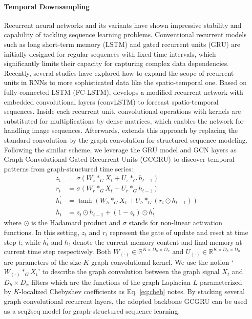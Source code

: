 \documentclass[sigconf,screen]{acmart}
\begin{document}
\paragraph{Temporal Downsampling}
Recurrent neural networks and its variants have shown impressive stability and capability of tackling sequence learning problems. Conventional recurrent models such as long short-term memory (LSTM) \cite{hochreiter1997long} and gated recurrent units (GRU) \cite{chung2014empirical} are initially designed for regular sequences with fixed time intervals, which significantly limits their capacity for capturing complex data dependencies. Recently, several studies have explored how to expand the scope of recurrent units in RNNs to more sophisticated data like the spatio-temporal one. Based on fully-connected LSTM (FC-LSTM), \cite{xingjian2015convolutional} develops a modified recurrent network with embedded convolutional layers (convLSTM) to forecast spatio-temporal sequences. Inside each recurrent unit, convolutional operations with kernels are substituted for multiplications by dense matrices, which enables the network for handling image sequences. Afterwards, \cite{seo2018structured} extends this approach by replacing the standard convolution by the graph convolution for structured sequence modeling. Following the similar scheme, we leverage the GRU model and GCN layers as Graph Convolutional Gated Recurrent Units (GCGRU) to discover temporal patterns from graph-structured time series:
\begin{equation}
\begin{aligned}
\label{eq:gcgru}
z _ { t } &= \sigma \left( W_z *_G X _ { t } + U_z *_G h _ { t - 1 } \right)\\
r _ { t } &= \sigma \left( W_r *_G X _ { t } + U_r *_G h _ { t - 1 } \right)\\
h _ { t } ^ { \prime } &= \tanh \left( W_h *_G X _ { t } + U_h *_G (r _ { t } \odot h _ { t - 1 }) \right)\\
h _ { t } &= z _ { t } \odot h _ { t - 1 } + \left( 1 - z _ { t } \right) \odot h _ { t } ^ { \prime }
\end{aligned}
\end{equation}
where $\odot$ is the Hadamard product and $\sigma$ stands for non-linear activation functions. In this setting, $z_t$ and $r_t$ represent the gate of update and reset at time step $t$; while $h_t^{\prime}$ and $h_t$ denote the current memory content and final memory at current time step respectively. Both $W_{(\cdot)} \in \mathbb{R}^{K \times D_h \times D_x}$ and $U_{(\cdot)} \in \mathbb{R}^{K \times D_h \times D_h}$ are parameters of the size-$K$ graph convolutional kernel. We use the notion `$W_{(\cdot)} *_G X_t$' to describe the graph convolution between the graph signal $X_t$ and $D_h \times D_x$ filters which are the functions of the graph Laplacian $L$ parameterized by $K$-localized Chebyshev coefficients as Eq. \eqref{eq:cheb} notes. By stacking several graph convolutional recurrent layers, the adopted backbone GCGRU can be used as a seq2seq model for graph-structured sequence learning.
\end{document}
